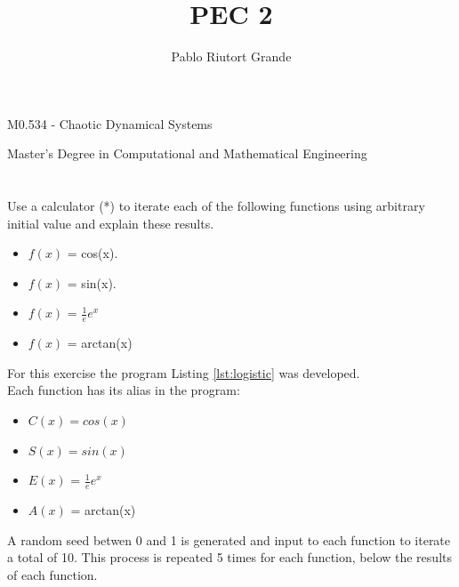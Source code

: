 \documentclass[11pt]{article}
\title{PEC 2}
\begin{document}
    \author{Pablo Riutort Grande}
    \maketitle
    
M0.534 - Chaotic Dynamical Systems

Master's Degree in Computational and Mathematical Engineering 

\hypertarget{section}{%
\section{}\label{section}}
 Use a calculator (*) to iterate each of the following functions using arbitrary
initial value and explain these results.
\begin{itemize}
    \item $f(x)$ = cos(x).
    \item $f(x)$ = sin(x).
    \item $f(x)$ = $\frac{1}{e}e^{x}$
    \item $f(x)$ = arctan(x)
\end{itemize}

For this exercise the program Listing \ref{lst:logistic} was developed.\\
Each function has its alias in the program:
\begin{itemize}
    \item $C(x) = cos(x)$
    \item $S(x) = sin(x)$
    \item $E(x)$ = $\frac{1}{e}e^{x}$
    \item $A(x)$ = arctan(x)
\end{itemize}
A random seed betwen 0 and 1 is generated and input to each function to iterate a total of 10. This process is repeated 5 times for each function, below the results of each function.
\end{document}

